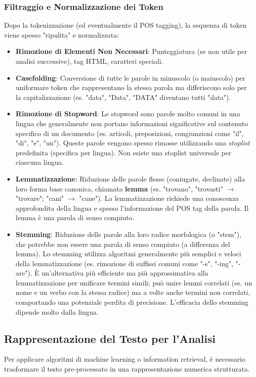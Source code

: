 \documentclass{article}
\begin{document}
\subsubsection{Filtraggio e Normalizzazione dei Token}
Dopo la tokenizzazione (ed eventualmente il POS tagging), la sequenza di token viene spesso "ripulita" e normalizzata:
\begin{itemize}
    \item \textbf{Rimozione di Elementi Non Necessari}: Punteggiatura (se non utile per analisi successive), tag HTML, caratteri speciali.
    \item \textbf{Casefolding}: Conversione di tutte le parole in minuscolo (o maiuscolo) per uniformare token che rappresentano la stessa parola ma differiscono solo per la capitalizzazione (es. "data", "Data", "DATA" diventano tutti "data").
    \item \textbf{Rimozione di Stopword}: Le stopword sono parole molto comuni in una lingua che generalmente non portano informazioni significative sul contenuto specifico di un documento (es. articoli, preposizioni, congiunzioni come "il", "di", "e", "un"). Queste parole vengono spesso rimosse utilizzando una \textit{stoplist} predefinita (specifica per lingua). Non esiste una stoplist universale per ciascuna lingua.
    \item \textbf{Lemmatizzazione}: Riduzione delle parole flesse (coniugate, declinate) alla loro forma base canonica, chiamata \textbf{lemma} (es. "trovano", "trovasti" $\rightarrow$ "trovare"; "cani" $\rightarrow$ "cane"). La lemmatizzazione richiede una conoscenza approfondita della lingua e spesso l'informazione del POS tag della parola. Il lemma è una parola di senso compiuto.
    \item \textbf{Stemming}: Riduzione delle parole alla loro radice morfologica (o "stem"), che potrebbe non essere una parola di senso compiuto (a differenza del lemma). Lo stemming utilizza algoritmi generalmente più semplici e veloci della lemmatizzazione (es. rimozione di suffissi comuni come "-s", "-ing", "-are"). È un'alternativa più efficiente ma più approssimativa alla lemmatizzazione per unificare termini simili; può unire lemmi correlati (es. un nome e un verbo con la stessa radice) ma a volte anche termini non correlati, comportando una potenziale perdita di precisione. L'efficacia dello stemming dipende molto dalla lingua.
\end{itemize}

\subsection{Rappresentazione del Testo per l'Analisi}
Per applicare algoritmi di machine learning o information retrieval, è necessario trasformare il testo pre-processato in una rappresentazione numerica strutturata.
\end{document}
